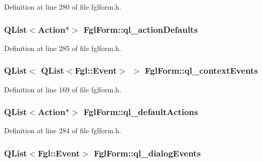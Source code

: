 Definition at line 280 of file fglform.h.

\hypertarget{classFglForm_a6b78dae39bcab3791a9acc99a3b8248d}{
\subsubsection[{ql\_\-actionDefaults}]{\setlength{\rightskip}{0pt plus 5cm}QList$<${\bf Action}$\ast$$>$ {\bf FglForm::ql\_\-actionDefaults}}}
\label{classFglForm_a6b78dae39bcab3791a9acc99a3b8248d}


Definition at line 285 of file fglform.h.

\hypertarget{classFglForm_ac7920cda2f9ebef4076ff19e73cfa047}{
\subsubsection[{ql\_\-contextEvents}]{\setlength{\rightskip}{0pt plus 5cm}QList$<$ QList$<${\bf Fgl::Event}$>$ $>$ {\bf FglForm::ql\_\-contextEvents}}}
\label{classFglForm_ac7920cda2f9ebef4076ff19e73cfa047}


Definition at line 169 of file fglform.h.

\hypertarget{classFglForm_acc7f6b6c7b13cf1e6e39bfdeba18ddc1}{
\subsubsection[{ql\_\-defaultActions}]{\setlength{\rightskip}{0pt plus 5cm}QList$<${\bf Action}$\ast$$>$ {\bf FglForm::ql\_\-defaultActions}}}
\label{classFglForm_acc7f6b6c7b13cf1e6e39bfdeba18ddc1}


Definition at line 284 of file fglform.h.

\hypertarget{classFglForm_a764e11f62e1849d568cda143fa11583e}{
\subsubsection[{ql\_\-dialogEvents}]{\setlength{\rightskip}{0pt plus 5cm}QList$<${\bf Fgl::Event}$>$ {\bf FglForm::ql\_\-dialogEvents}}}
\label{classFglForm_a764e11f62e1849d568cda143fa11583e}


